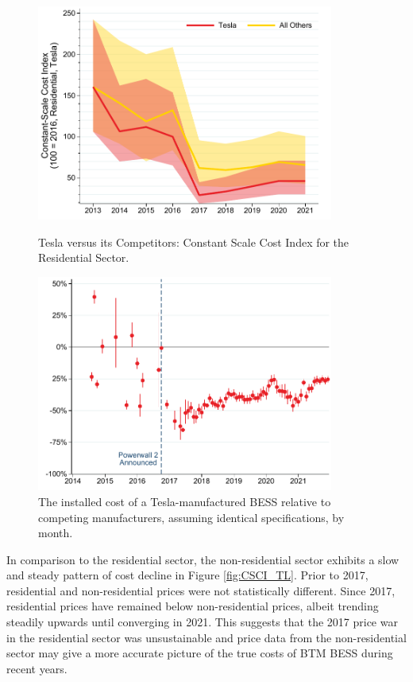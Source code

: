 \documentclass[preprint,12pt,authoryear]{elsarticle}
\begin{document}
\begin{figure}[p]
\centering
\includegraphics[width=0.87\textwidth]{graphs/CA_SGIP/CSCI_by_mfr.pdf}
\caption{Tesla versus its Competitors: Constant Scale Cost Index for the Residential Sector.}\label{fig:CSCI_by_mfr}

\includegraphics[width=0.87\textwidth]{graphs/CA_SGIP/TSLA_cost_adv.pdf}
\caption{The installed cost of a Tesla-manufactured BESS relative to competing manufacturers, assuming identical specifications, by month.}\label{fig:TSLA_cost_adv}
\end{figure}

In comparison to the residential sector, the non-residential sector exhibits a slow and steady pattern of cost decline in Figure \ref{fig:CSCI_TL}. Prior to 2017, residential and non-residential prices were not statistically different. Since 2017, residential prices have remained below non-residential prices, albeit trending steadily upwards until converging in 2021. This suggests that the 2017 price war in the residential sector was unsustainable and price data from the non-residential sector may give a more accurate picture of the true costs of BTM BESS during recent years. 
\end{document}
